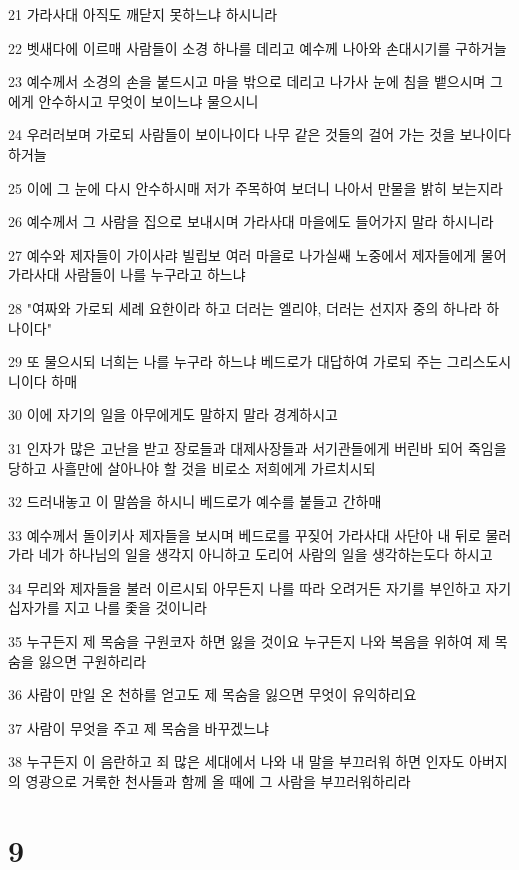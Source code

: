 \par 21 가라사대 아직도 깨닫지 못하느냐 하시니라
\par 22 벳새다에 이르매 사람들이 소경 하나를 데리고 예수께 나아와 손대시기를 구하거늘
\par 23 예수께서 소경의 손을 붙드시고 마을 밖으로 데리고 나가사 눈에 침을 뱉으시며 그에게 안수하시고 무엇이 보이느냐 물으시니
\par 24 우러러보며 가로되 사람들이 보이나이다 나무 같은 것들의 걸어 가는 것을 보나이다 하거늘
\par 25 이에 그 눈에 다시 안수하시매 저가 주목하여 보더니 나아서 만물을 밝히 보는지라
\par 26 예수께서 그 사람을 집으로 보내시며 가라사대 마을에도 들어가지 말라 하시니라
\par 27 예수와 제자들이 가이사랴 빌립보 여러 마을로 나가실쌔 노중에서 제자들에게 물어 가라사대 사람들이 나를 누구라고 하느냐
\par 28 "여짜와 가로되 세례 요한이라 하고 더러는 엘리야, 더러는 선지자 중의 하나라 하나이다"
\par 29 또 물으시되 너희는 나를 누구라 하느냐 베드로가 대답하여 가로되 주는 그리스도시니이다 하매
\par 30 이에 자기의 일을 아무에게도 말하지 말라 경계하시고
\par 31 인자가 많은 고난을 받고 장로들과 대제사장들과 서기관들에게 버린바 되어 죽임을 당하고 사흘만에 살아나야 할 것을 비로소 저희에게 가르치시되
\par 32 드러내놓고 이 말씀을 하시니 베드로가 예수를 붙들고 간하매
\par 33 예수께서 돌이키사 제자들을 보시며 베드로를 꾸짖어 가라사대 사단아 내 뒤로 물러가라 네가 하나님의 일을 생각지 아니하고 도리어 사람의 일을 생각하는도다 하시고
\par 34 무리와 제자들을 불러 이르시되 아무든지 나를 따라 오려거든 자기를 부인하고 자기 십자가를 지고 나를 좇을 것이니라
\par 35 누구든지 제 목숨을 구원코자 하면 잃을 것이요 누구든지 나와 복음을 위하여 제 목숨을 잃으면 구원하리라
\par 36 사람이 만일 온 천하를 얻고도 제 목숨을 잃으면 무엇이 유익하리요
\par 37 사람이 무엇을 주고 제 목숨을 바꾸겠느냐
\par 38 누구든지 이 음란하고 죄 많은 세대에서 나와 내 말을 부끄러워 하면 인자도 아버지의 영광으로 거룩한 천사들과 함께 올 때에 그 사람을 부끄러워하리라

\chapter{9}

